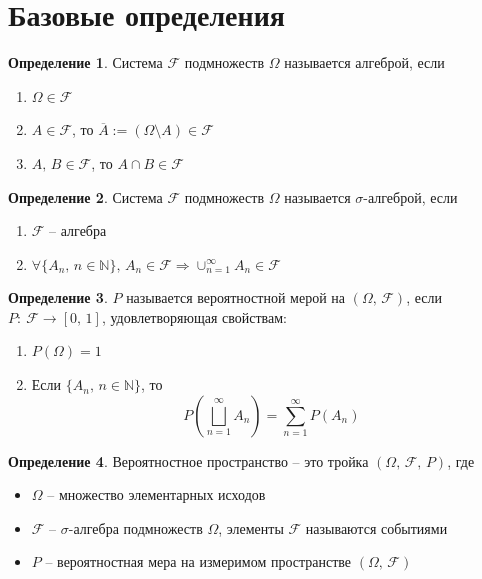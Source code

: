 \documentclass[a4paper,12pt]{article}
\theoremstyle{plain}
\theoremstyle{definition}
\newtheorem{definition}{Определение}[section]
\theoremstyle{remark}
\begin{document}
\tableofcontents
\newpage

\section{Базовые определения}

\begin{definition}
	Система $\mathcal{F}$ подмножеств $\Omega$ называется алгеброй, если
	\begin{enumerate}
		\item $\Omega \in \mathcal{F}$
		\item $A \in \mathcal{F}$, то $\overline{A} := (\Omega \setminus A) \in \mathcal{F}$
		\item $A,\, B \in \mathcal{F}$, то $A \cap B \in \mathcal{F}$
	\end{enumerate}
\end{definition}

\begin{definition}
	Система $\mathcal{F}$ подмножеств $\Omega$ называется $\sigma$-алгеброй, если
	\begin{enumerate}
		\item $\mathcal{F}$ -- алгебра
		\item $\forall \{A_n,\, n \in \mathbb{N}\},\, A_n \in \mathcal{F} \Rightarrow \cup_{n = 1}^\infty A_n \in \mathcal{F}$
	\end{enumerate}
\end{definition}

\begin{definition}
	$P$ называется вероятностной мерой на $(\Omega,\, \mathcal{F})$, если $P:\: \mathcal{F} \to [0,\,1]$, удовлетворяющая свойствам:
	\begin{enumerate}
		\item $P(\Omega) = 1$
		\item Если $\{A_n,\, n \in \mathbb{N}\}$, то
		      \[P\left(\bigsqcup_{n = 1}^\infty A_n\right) = \sum_{n = 1}^\infty P(A_n)\]
	\end{enumerate}
\end{definition}

\begin{definition}
	Вероятностное пространство -- это тройка $(\Omega,\, \mathcal{F},\, P)$, где
	\begin{itemize}
		\item $\Omega$ -- множество элементарных исходов
		\item $\mathcal{F}$ -- $\sigma$-алгебра подмножеств $\Omega$, элементы $\mathcal{F}$ называются событиями
		\item $P$ -- вероятностная мера на измеримом пространстве $(\Omega,\, \mathcal{F})$
	\end{itemize}
\end{definition}
\end{document}
